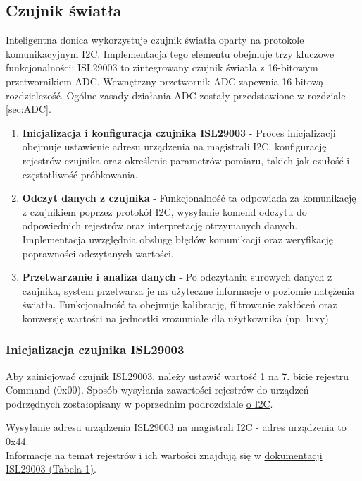 \subsection{Czujnik światła}
\label{sec:czujnik_swiatla}
Inteligentna donica wykorzystuje czujnik światła oparty na protokole komunikacyjnym I2C. Implementacja tego elementu obejmuje trzy kluczowe funkcjonalności:
ISL29003 to zintegrowany czujnik światła z 16-bitowym przetwornikiem ADC. Wewnętrzny przetwornik ADC zapewnia 16-bitową rozdzielczość. Ogólne zasady działania ADC zostały przedstawione w rozdziale \ref{sec:ADC}.

\begin{enumerate}
    \item \textbf{Inicjalizacja i konfiguracja czujnika ISL29003} - Proces inicjalizacji obejmuje ustawienie adresu urządzenia na magistrali I2C, konfigurację rejestrów czujnika oraz określenie parametrów pomiaru, takich jak czułość i częstotliwość próbkowania.

    \item \textbf{Odczyt danych z czujnika} - Funkcjonalność ta odpowiada za komunikację z czujnikiem poprzez protokół I2C, wysyłanie komend odczytu do odpowiednich rejestrów oraz interpretację otrzymanych danych. Implementacja uwzględnia obsługę błędów komunikacji oraz weryfikację poprawności odczytanych wartości.

    \item \textbf{Przetwarzanie i analiza danych} - Po odczytaniu surowych danych z czujnika, system przetwarza je na użyteczne informacje o poziomie natężenia światła. Funkcjonalność ta obejmuje kalibrację, filtrowanie zakłóceń oraz konwersję wartości na jednostki zrozumiałe dla użytkownika (np. luxy).
\end{enumerate}

\subsubsection{Inicjalizacja czujnika ISL29003}
    Aby zainicjować czujnik ISL29003, należy ustawić wartość 1 na 7. bicie rejestru Command (0x00). Sposób wysyłania zawartości rejestrów do urządzeń podrzędnych zostałopisany w poprzednim podrozdziale \hyperref[I2C_wysylanie_rejestrow]{o I2C}.%

    Wysyłanie adresu urządzenia ISL29003 na magistrali I2C - adres urządzenia to 0x44.\\
    Informacje na temat rejestrów i ich wartości znajdują się w \href{https://www.zsk.p.lodz.pl/~morawski/SCR&ES/NotyKatalogowe/ISL29003.pdf}{dokumentacji ISL29003 (Tabela 1)}.\\


